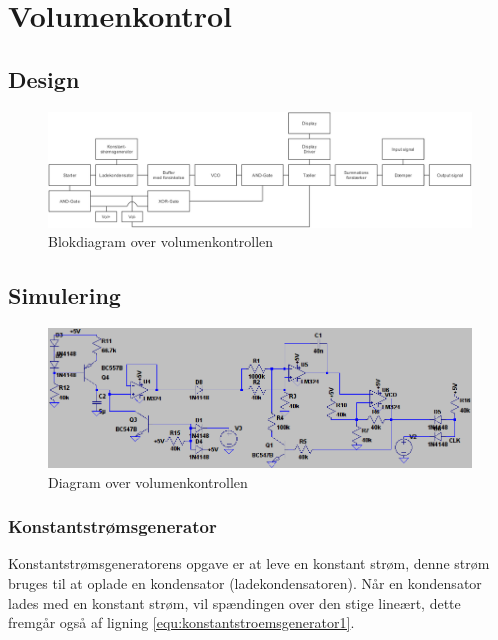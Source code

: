 \chapter{Volumenkontrol}
\label{volumenkontrol}

\section{Design}
\label{volumenkontrol-design}

\begin{figure}[h]
\centering
\includegraphics[width=\textwidth]{teknisk/volumenkontrol/blokdiagram.png}
\caption{Blokdiagram over volumenkontrollen}
\label{fig:volumenkontrol_opbygning}
\end{figure}

\section{Simulering}
\label{volumenkontrol-simulering}

\begin{figure}[h]
\centering
\includegraphics[width=\textwidth]{teknisk/volumenkontrol/diagram.png}
\caption{Diagram over volumenkontrollen}
\label{fig:volumenkontrol_diagram}
\end{figure}

\subsection{Konstantstrømsgenerator}
\label{volumenkontrol-simulering-konstantstroemsgenerator}

Konstantstrømsgeneratorens opgave er at leve en konstant strøm, denne strøm bruges til at oplade en kondensator (ladekondensatoren). Når en kondensator lades med en konstant strøm, vil spændingen over den stige lineært, dette fremgår også af ligning \ref{equ:konstantstroemsgenerator1}.


